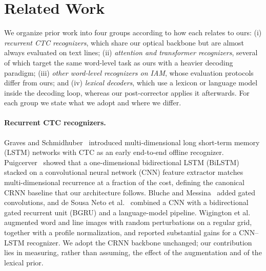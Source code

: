 \documentclass{ws-ijprai}
\begin{document}
\section{Related Work}
\label{sec:related}

We organize prior work into four groups according to how each relates
to ours: (i) \emph{recurrent CTC recognizers}, which share our optical
backbone but are almost always evaluated on text lines; (ii)
\emph{attention and transformer recognizers}, several of which target
the same word-level task as ours with a heavier decoding paradigm; (iii)
\emph{other word-level recognizers on IAM}, whose evaluation protocols
differ from ours; and (iv) \emph{lexical decoders}, which use a lexicon
or language model inside the decoding loop, whereas our post-corrector
applies it afterwards. For each group we state what we adopt and where
we differ.

\paragraph{Recurrent CTC recognizers.}
Graves and Schmidhuber~\cite{graves2008offline} introduced
multi-dimensional long short-term memory (LSTM) networks with CTC as
an early end-to-end offline recognizer. Puigcerver~\cite{puigcerver2017}
showed that a one-dimensional bidirectional LSTM (BiLSTM) stacked on a
convolutional neural network (CNN) feature extractor matches
multi-dimensional recurrence at a fraction of the cost, defining the
canonical CRNN baseline that our architecture follows. Bluche and
Messina~\cite{bluche2017gated} added gated convolutions, and de Sousa Neto et
al.~\cite{flor2020htrflor} combined a CNN with a bidirectional gated
recurrent unit (BGRU) and a language-model pipeline. Wigington et
al.~\cite{wigington2017data} augmented word and line images with random
perturbations on a regular grid, together with a profile normalization,
and reported substantial gains for a CNN--LSTM recognizer.
We adopt the CRNN backbone unchanged; our contribution lies in
measuring, rather than assuming, the effect of the augmentation and of
the lexical prior.
\end{document}
